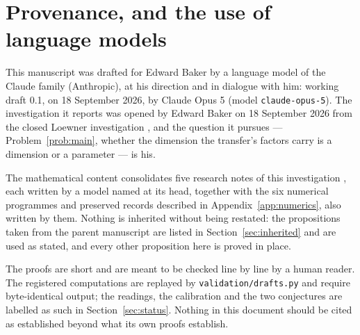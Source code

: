 \section{Provenance, and the use of language models}\label{app:provenance}

This manuscript was drafted for Edward Baker by a language model of the Claude
family (Anthropic), at his direction and in dialogue with him: working draft 0.1,
on 18 September 2026, by Claude Opus 5 (model \texttt{claude-opus-5}). The
investigation it reports was opened by Edward Baker on 18 September 2026 from the
closed Loewner investigation \cite{Markov}, and the question it pursues ---
Problem~\ref{prob:main}, whether the dimension the transfer's factors carry is a
dimension or a parameter --- is his.

The mathematical content consolidates five research notes of this investigation
\cite{OpeningNote,WhichDimension,RankNote,WallNote,TradeNote}, each written by a
model named at its head, together with the six numerical programmes and preserved
records described in Appendix~\ref{app:numerics}, also written by them. Nothing
is inherited without being restated: the propositions taken from the parent
manuscript are listed in Section~\ref{sec:inherited} and are used as stated, and
every other proposition here is proved in place.

The proofs are short and are meant to be checked line by line by a human reader.
The registered computations are replayed by \texttt{validation/drafts.py} and
require byte-identical output; the readings, the calibration and the two
conjectures are labelled as such in Section~\ref{sec:status}. Nothing in this
document should be cited as established beyond what its own proofs establish.
